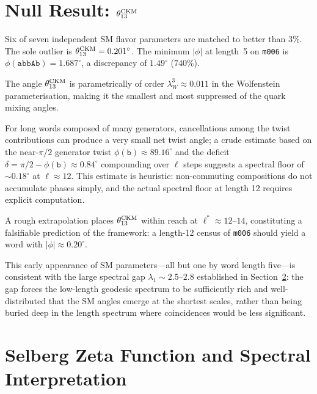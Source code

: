 ﻿\documentclass[aps,prd,twocolumn,longbibliography]{revtex4-2}
\newcommand{\mfld}[1]{\texttt{#1}}
\newcommand{\word}[1]{\texttt{#1}}
\newcommand{\degr}{^{\circ}}
\begin{document}
\section{Null Result: \texorpdfstring{\texorpdfstring{$\theta_{13}^{\rm CKM}$}{theta13 CKM}}{theta13(CKM)}}
\label{sec:null}

Six of seven independent SM flavor parameters are matched to better than $3\%$.
The sole outlier is $\theta_{13}^{\rm CKM}=0.201\degr$.
The minimum $|\phi|$ at length~5 on \mfld{m006} is
$\phi(\word{abbAb})=1.687\degr$, a discrepancy of $1.49\degr$ ($740\%$).

The angle $\theta_{13}^{\rm CKM}$ is parametrically of order
$\lambda_W^3\approx 0.011$ in the Wolfenstein parameterisation,
making it the smallest and most suppressed of the quark mixing angles.

For long words composed of many generators, cancellations among the
twist contributions can produce a very small net twist angle; a
crude estimate based on the near-$\pi/2$ generator twist
$\phi(\word{b})\approx 89.16\degr$ and the deficit
$\delta=\pi/2-\phi(\word{b})\approx 0.84\degr$ compounding over
$\ell$ steps suggests a spectral floor of ${\sim}0.18\degr$ at
$\ell\approx 12$.
This estimate is heuristic: non-commuting compositions do not accumulate
phases simply, and the actual spectral floor at length 12 requires
explicit computation.

A rough extrapolation places $\theta_{13}^{\rm CKM}$ within reach at
$\ell^*\approx 12$--$14$, constituting a falsifiable prediction of the
framework: a length-12 census of \mfld{m006} should yield a word with
$|\phi|\approx 0.20\degr$.

This early appearance of SM parameters---all but one by word length
five---is consistent with the large spectral gap $\lambda_1\sim 2.5$--$2.8$
established in Section~\ref{sec:selberg}: the gap forces the low-length
geodesic spectrum to be sufficiently rich and well-distributed that the SM
angles emerge at the shortest scales, rather than being buried deep in the
length spectrum where coincidences would be less significant.

\section{Selberg Zeta Function and Spectral Interpretation}
\label{sec:selberg}
\end{document}
